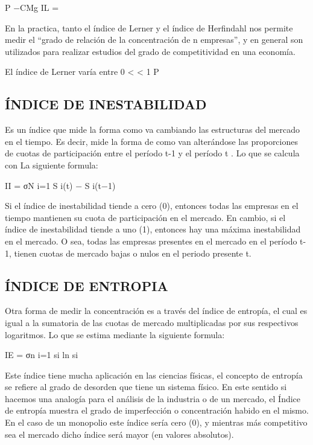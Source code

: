 \documentclass[
  letterpaper,
  DIV=11,
  numbers=noendperiod]{scrartcl}
\begin{document}
P −CMg IL =

En la practica, tanto el índice de Lerner y el índice de Herfindahl nos
permite medir el ``grado de relación de la concentración de n
empresas'', y en general son utilizados para realizar estudios del grado
de competitividad en una economía.

El índice de Lerner varía entre 0 \textless{} \textless{} 1 P

\hypertarget{uxedndice-de-inestabilidad}{%
\subsection{ÍNDICE DE INESTABILIDAD}\label{uxedndice-de-inestabilidad}}

Es un índice que mide la forma como va cambiando las estructuras del
mercado en el tiempo. Es decir, mide la forma de como van alterándose
las proporciones de cuotas de participación entre el período t-1 y el
período t . Lo que se calcula con La siguiente formula:

II = σN i=1 S i(t) − S i(t−1)

Si el índice de inestabilidad tiende a cero (0), entonces todas las
empresas en el tiempo mantienen su cuota de participación en el mercado.
En cambio, si el índice de inestabilidad tiende a uno (1), entonces hay
una máxima inestabilidad en el mercado. O sea, todas las empresas
presentes en el mercado en el período t-1, tienen cuotas de mercado
bajas o nulos en el periodo presente t.

\hypertarget{uxedndice-de-entropia}{%
\subsection{ÍNDICE DE ENTROPIA}\label{uxedndice-de-entropia}}

Otra forma de medir la concentración es a través del índice de entropía,
el cual es igual a la sumatoria de las cuotas de mercado multiplicadas
por sus respectivos logaritmos. Lo que se estima mediante la siguiente
formula:

IE = σn i=1 si ln si

Este índice tiene mucha aplicación en las ciencias físicas, el concepto
de entropía se refiere al grado de desorden que tiene un sistema físico.
En este sentido si hacemos una analogía para el análisis de la industria
o de un mercado, el Índice de entropía muestra el grado de imperfección
o concentración habido en el mismo. En el caso de un monopolio este
índice sería cero (0), y mientras más competitivo sea el mercado dicho
índice será mayor (en valores absolutos).
\end{document}
